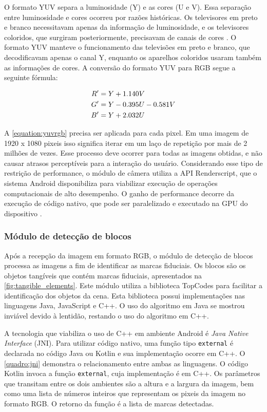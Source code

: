 O formato YUV separa a luminosidade (Y) e as cores (U e V). Essa separação entre luminosidade e cores ocorreu por razões históricas. Os televisores em preto e branco necessitavam apenas da informação de luminosidade, e os televisores coloridos, que surgiram posteriormente, precisavam de canais de cores \cite{jack_video_2001}. O formato YUV manteve o funcionamento das televisões em preto e branco, que decodificavam apenas o canal Y, enquanto os aparelhos coloridos usaram também as informações de cores. A conversão do formato YUV para RGB segue a seguinte fórmula:

\begin{equation}
\label{equation:yuvrgb}
\centering
\begin{aligned}
R' &= Y + 1.140V \\
G' &= Y - 0.395U - 0.581V \\
B' &= Y + 2.032U
\end{aligned}
\end{equation}

A \autoref{equation:yuvrgb} precisa ser aplicada para cada pixel. Em uma imagem de 1920 x 1080 pixeis isso significa iterar em um laço de repetição por mais de 2 milhões de vezes. Esse processo deve ocorrer para todas as imagens obtidas, e não causar atrasos perceptíveis para a interação do usuário. Considerando esse tipo de restrição de performance, o módulo de câmera utiliza a API Renderscript, que o sistema Android disponibiliza para viabilizar execução de operações computacionais de alto desempenho. O ganho de performance decorre da execução de código nativo, que pode ser paralelizado e executado na GPU do dispositivo \cite{sams_introducing_2011}.


\subsubsection{Módulo de detecção de blocos}

Após a recepção da imagem em formato RGB, o módulo de detecção de blocos processa as imagens a fim de identificar as marcas fiduciais. Os blocos são os objetos tangíveis que contém marcas fiduciais, apresentados na \autoref{fig:tangible_elements}. Este módulo utiliza a biblioteca TopCodes para facilitar a identificação dos objetos da cena. Esta biblioteca possui implementações nas linguagens Java, JavaScript e C++. O uso do algoritmo em Java se mostrou inviável devido à lentidão, restando o uso do algoritmo em C++. 

A tecnologia que viabiliza o uso de C++ em ambiente Android é \textit{Java Native Interface} (JNI). Para utilizar código nativo, uma função tipo \texttt{external} é declarada no código Java ou Kotlin e sua implementação ocorre em C++. O \autoref{quadro:jni} demonstra o relacionamento entre ambas as linguagens. O código Kotlin invoca a função \texttt{external}, cuja implementação é em C++. Os parâmetros que transitam entre os dois ambientes são a altura e a largura da imagem, bem como uma lista de números inteiros que representam os pixeis da imagem no formato RGB. O retorno da função é a lista de marcas detectadas.

